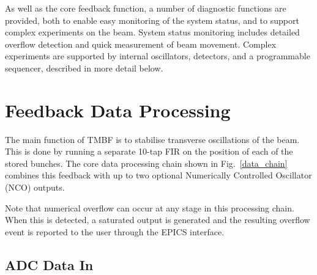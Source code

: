 \documentclass{jacow}
\newcommand{\squarecaption}[2][1]{\caption[#1]{#2\unskip\parfillskip 0pt}}
\begin{document}
As well as the core feedback function, a number of diagnostic functions are
provided, both to enable easy monitoring of the system status, and to support
complex experiments on the beam.  System status monitoring includes detailed
overflow detection and quick measurement of beam movement.  Complex experiments
are supported by internal oscillators, detectors, and a programmable sequencer,
described in more detail below.


\begin{figure*}[t]
\begin{centering}

\end{centering}
\squarecaption{
This is the core data processing chain in the TMBF processor.  Data processing
starts by adding a DC offset to each of the four ADC channels to compensate for
static ADC errors, followed by a 3-tap filter to compensate for high frequency
phase errors in the front end.  The minimum and maximum value per bunch of both
the ADC and DAC streams is captured for display.  A 10-tap filter with
programmable gain (in 6\,dB steps) is applied in turn to each bunch in the ring.
The output multiplexer adds any combination of its three inputs, which is then
scaled by a bunch specific gain.  Finally an output pre-emphasis filter corrects
for amplifier errors and is followed by a delay line to correctly close the
loop.
}
\label{data_chain}
\end{figure*}


\section{Feedback Data Processing}

The main function of TMBF is to stabilise transverse oscillations of the beam.
This is done by running a separate 10-tap FIR on the position of each of the
stored bunches.  The core data processing chain shown in Fig.~\ref{data_chain}
combines this feedback with up to two optional Numerically Controlled Oscillator
(NCO) outputs.

Note that numerical overflow can occur at any stage in this processing chain.
When this is detected, a saturated output is generated and the resulting
overflow event is reported to the user through the EPICS interface.


\subsection{ADC Data In}
\end{document}

